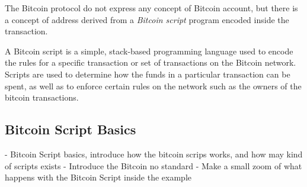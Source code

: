 The Bitcoin protocol do not express any concept of Bitcoin account, but there is a concept of address
derived from a \emph{Bitcoin script} program encoded inside the transaction.

A Bitcoin script is a simple, stack-based programming language used to encode the rules for a specific
transaction or set of transactions on the Bitcoin network. Scripts are used to determine how the
funds in a particular transaction can be spent, as well as to enforce certain rules on the network such as the owners
of the bitcoin transactions.

\subsection{Bitcoin Script Basics}

- Bitcoin Script basics, introduce how the bitcoin scrips works, and how may
kind of scripts exists
- Introduce the Bitcoin no standard
- Make a small zoom of what happens with the Bitcoin Script inside the example
